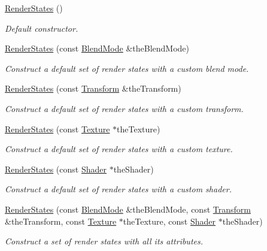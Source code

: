 \begin{DoxyCompactItemize}
\item 
\hyperlink{classsf_1_1_render_states_a885bf14070d0d5391f062f62b270b7d0}{Render\+States} ()
\begin{DoxyCompactList}\small\item\em Default constructor. \end{DoxyCompactList}\item 
\hyperlink{classsf_1_1_render_states_acac8830a593c8a4523ac2fdf3cac8a01}{Render\+States} (const \hyperlink{structsf_1_1_blend_mode}{Blend\+Mode} \&the\+Blend\+Mode)
\begin{DoxyCompactList}\small\item\em Construct a default set of render states with a custom blend mode. \end{DoxyCompactList}\item 
\hyperlink{classsf_1_1_render_states_a3e99cad6ab05971d40357949930ed890}{Render\+States} (const \hyperlink{classsf_1_1_transform}{Transform} \&the\+Transform)
\begin{DoxyCompactList}\small\item\em Construct a default set of render states with a custom transform. \end{DoxyCompactList}\item 
\hyperlink{classsf_1_1_render_states_a8f4ca3be0e27dafea0c4ab8547439bb1}{Render\+States} (const \hyperlink{classsf_1_1_texture}{Texture} $\ast$the\+Texture)
\begin{DoxyCompactList}\small\item\em Construct a default set of render states with a custom texture. \end{DoxyCompactList}\item 
\hyperlink{classsf_1_1_render_states_a39f94233f464739d8d8522f3aefe97d0}{Render\+States} (const \hyperlink{classsf_1_1_shader}{Shader} $\ast$the\+Shader)
\begin{DoxyCompactList}\small\item\em Construct a default set of render states with a custom shader. \end{DoxyCompactList}\item 
\hyperlink{classsf_1_1_render_states_ab5eda13cd8c79c74eba3b1b0df817d67}{Render\+States} (const \hyperlink{structsf_1_1_blend_mode}{Blend\+Mode} \&the\+Blend\+Mode, const \hyperlink{classsf_1_1_transform}{Transform} \&the\+Transform, const \hyperlink{classsf_1_1_texture}{Texture} $\ast$the\+Texture, const \hyperlink{classsf_1_1_shader}{Shader} $\ast$the\+Shader)
\begin{DoxyCompactList}\small\item\em Construct a set of render states with all its attributes. \end{DoxyCompactList}\end{DoxyCompactItemize}
